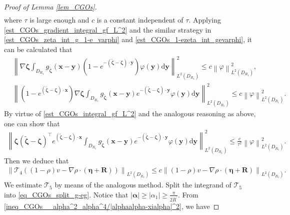 \documentclass[11pt,reqno,oneside]{amsart}
\theoremstyle{definition}
\theoremstyle{remark}
\numberwithin{equation}{section}
\numberwithin{equation}{section}
\theoremstyle{remark}
\begin{document}
\begin{proof}[Proof of Lemma \ref{lem_CGOs}]
\begin{align}
	\end{align}
	where $ \tau $ is large enough and $ c $ is a constant independent of $ \tau $. Applying \eqref{est_CGOs_gradient_integral_gf_L^2} and the similar strategy in \eqref{est_CGOs_zeta_int_g_1-e_varphi} and \eqref{est_CGOs_1-ezeta_int_gevarphi}, it can be calculated that
	\begin{align*} 
		& \left\| \nabla \bm{\zeta} \int_{D_{R_1}} g_{\tilde{\bm{\zeta}}}\left(\mathbf{x} - \mathbf{y}\right) \left(1 - e^{-\left(\tilde{\bm{\zeta}}-\bm{\zeta}\right) \cdot \mathbf{y}} \right) \varphi \left(\mathbf{y}\right) \mathrm{d} \mathbf{y} \right\|^2_{L^2\left(D_{R_1}\right)} \leqslant c \left\| \varphi \right\|^2_{L^2\left(D_{R_1}\right)} , \\
		& \left\| \left(1 - e^{\left(\tilde{\bm{\zeta}}-\bm{\zeta}\right) \cdot \mathbf{x}} \right) \nabla \bm{\zeta} \int_{D_{R_1}} g_{\tilde{\bm{\zeta}}}\left(\mathbf{x} - \mathbf{y}\right) e^{-\left(\tilde{\bm{\zeta}}-\bm{\zeta}\right) \cdot \mathbf{y}} \varphi \left(\mathbf{y}\right) \mathrm{d} \mathbf{y} \right\|^2_{L^2\left(D_{R_1}\right)} \leqslant c \left\| \varphi \right\|^2_{L^2\left(D_{R_1}\right)} .
	\end{align*}
	By virtue of \eqref{est_CGOs_integral_gf_L^2} and the analogous reasoning as above, one can show that
	\begin{align*} 
		\left\| \bm{\zeta} \left(\tilde{\bm{\zeta}}-\bm{\zeta}\right)^{\top} e^{\left(\tilde{\bm{\zeta}}-\bm{\zeta}\right) \cdot \mathbf{x}} \int_{D_{R_1}} g_{\tilde{\bm{\zeta}}}\left(\mathbf{x} - \mathbf{y}\right) e^{-\left(\tilde{\bm{\zeta}}-\bm{\zeta}\right) \cdot \mathbf{y}} \varphi \left(\mathbf{y}\right) \mathrm{d} \mathbf{y} \right\|^2_{L^2\left(D_{R_1}\right)} \leqslant \frac{c}{\tau^2} \left\| \varphi \right\|^2_{L^2\left(D_{R_1}\right)} .
	\end{align*}
	Then we deduce that 
	\begin{align*}
		\left\| \mathcal{T}_4 \left(\left(1-\rho\right) v - \nabla \rho \cdot \left(\bm{\eta}+\mathbf{R}\right)\right) \right\|_{L^2\left(D_{R_1}\right)} \leqslant c \left\| \left(1-\rho\right) v - \nabla \rho \cdot \left(\bm{\eta}+\mathbf{R}\right) \right\|_{L^2\left(D_{R_1}\right)} .
	\end{align*}	
	We estimate $ \mathcal{T}_5 $ by means of the analogous method. Split the integrand of $ \mathcal{T}_5 $ into \eqref{eq_CGOs_split_g-eg}. Notice that $ \left|\bm{\alpha}\right| \geqslant \left|\alpha_1\right| \geqslant \frac{\pi}{2R^{\prime}} $. From \eqref{ineq_CGOs__alpha^2_alpha^4/|alphaalpha-xialpha|^2}, we have

\end{proof}
\end{document}
